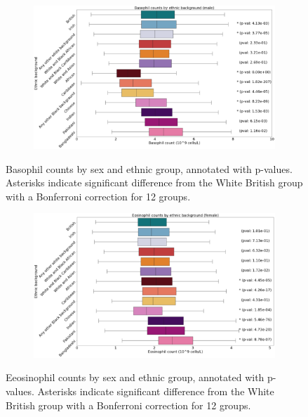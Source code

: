 \documentclass[12pt]{pnas-new}
\begin{document}
\begin{figure}
    \centering
    \begin{subfigure}{\textwidth}
    \includegraphics[width=\textwidth]{images/male_basophill_boxplot_annotated.pdf}
    \end{subfigure}
    \caption{Basophil counts by sex and ethnic group, annotated with p-values. Asterisks indicate significant difference from the White British group with a Bonferroni correction for 12 groups.}
    \label{fig:supp_box_basophill_m}
\end{figure}

\begin{figure}
    \centering
    \begin{subfigure}{\textwidth}
    \includegraphics[width=\textwidth]{images/female_eosinophill_boxplot_annotated.pdf}
    \end{subfigure}
    \caption{Eeosinophil counts by sex and ethnic group, annotated with p-values. Asterisks indicate significant difference from the White British group with a Bonferroni correction for 12 groups.}
    \label{fig:supp_box_eosinophill_f}
\end{figure}
\end{document}
